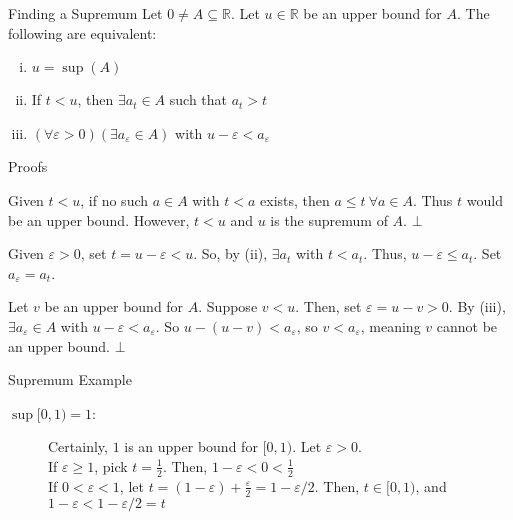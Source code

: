 \documentclass[10pt]{extarticle}
\newcommand{\R}{\mathbb{R}}
\begin{document}
  \begin{problem}{Finding a Supremum}
    Let $0\neq A\subseteq \R$. Let $u\in\R$ be an upper bound for $A$. The following are equivalent:
    \begin{enumerate}[(i)]
      \item $u=\sup(A)$
      \item If $t<u$, then $\exists a_t\in A$ such that $a_t > t$
      \item $(\forall \varepsilon > 0)(\exists a_{\varepsilon}\in A)$ with $u-\varepsilon < a_{\varepsilon}$
    \end{enumerate}
    \begin{problem}{Proofs}
      \begin{description}[font=\normalfont]
        \item[(i) $\Rightarrow$ (ii):] Given $t < u$, if no such $a\in A$ with $t < a$ exists, then $a \leq t~\forall a\in A$. Thus $t$ would be an upper bound. However, $t < u$ and $u$ is the supremum of $A$. $\bot$
        \item[(ii) $\Rightarrow$ (iii):] Given $\varepsilon > 0$, set $t = u-\varepsilon < u$. So, by (ii), $\exists a_t$ with $t < a_t$. Thus, $u-\varepsilon \leq a_t$. Set $a_{\varepsilon} = a_t$.
        \item[(iii) $\Rightarrow$ (i):] Let $v$ be an upper bound for $A$. Suppose $v < u$. Then, set $\varepsilon = u-v > 0$. By (iii), $\exists a_{\varepsilon}\in A$ with $u-\varepsilon < a_{\varepsilon}$. So $u-(u-v) < a_{\varepsilon}$, so $v < a_{\varepsilon}$, meaning $v$ cannot be an upper bound. $\bot$
      \end{description}
    \end{problem}
  \end{problem}
  \begin{problem}{Supremum Example}
    \begin{description}
      \item[$\sup [0,1) = 1$:] Certainly, $1$ is an upper bound for $[0,1)$. Let $\varepsilon > 0$.\\

        If $\varepsilon \geq 1$, pick $t = \frac{1}{2}$. Then, $1-\varepsilon < 0 < \frac{1}{2}$\\

        If $0 < \varepsilon < 1$, let $t = (1-\varepsilon) + \frac{\varepsilon}{2} = 1-\varepsilon/2$. Then, $t\in [0,1)$, and $1-\varepsilon < 1-\varepsilon/2 = t$
    \end{description}
  \end{problem}
\end{document}
